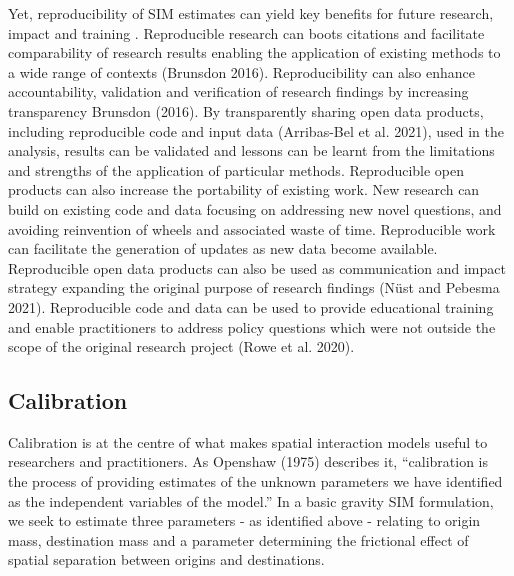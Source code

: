 \documentclass[11pt,letterpaper]{article}
\begin{document}
Yet, reproducibility of SIM estimates can yield key benefits for future research, impact and training .
Reproducible research can boots citations and facilitate comparability of research results enabling the application of existing methods to a wide range of contexts (Brunsdon 2016). Reproducibility can also enhance accountability, validation and verification of research findings by increasing transparency Brunsdon (2016).
By transparently sharing open data products, including reproducible code and input data (Arribas-Bel et al. 2021), used in the analysis, results can be validated and lessons can be learnt from the limitations and strengths of the application of particular methods.
Reproducible open products can also increase the portability of existing work.
New research can build on existing code and data focusing on addressing new novel questions, and avoiding reinvention of wheels and associated waste of time.
Reproducible work can facilitate the generation of updates as new data become available.
Reproducible open data products can also be used as communication and impact strategy expanding the original purpose of research findings (Nüst and Pebesma 2021).
Reproducible code and data can be used to provide educational training and enable practitioners to address policy questions which were not outside the scope of the original research project (Rowe et al. 2020).

\hypertarget{calibration}{%
\subsection{\texorpdfstring{Calibration }{Calibration }}\label{calibration}}

Calibration is at the centre of what makes spatial interaction models useful to researchers and practitioners.
As Openshaw (1975) describes it, ``calibration is the process of providing estimates of the unknown parameters we have identified as the independent variables of the model.'' In a basic gravity SIM formulation, we seek to estimate three parameters - as identified above - relating to origin mass, destination mass and a parameter determining the frictional effect of spatial separation between origins and destinations.
\end{document}
